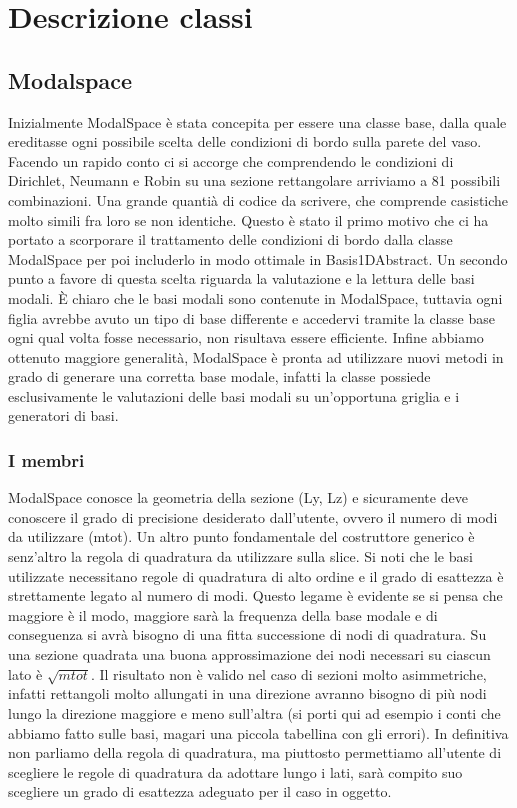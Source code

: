 \chapter{Descrizione classi}
\section{Modalspace}

Inizialmente ModalSpace \`e stata concepita per essere una classe base, dalla quale ereditasse ogni possibile scelta delle condizioni di bordo sulla parete del vaso. Facendo un rapido conto ci si accorge che comprendendo le condizioni di Dirichlet, Neumann e Robin su una sezione rettangolare arriviamo a 81 possibili combinazioni. Una grande quanti\`a di codice da scrivere, che comprende casistiche molto simili fra loro se non identiche. Questo \`e stato il primo motivo che ci ha portato a scorporare il trattamento delle condizioni di bordo dalla classe ModalSpace per poi includerlo in modo ottimale in Basis1DAbstract. Un secondo punto a favore di questa scelta riguarda la valutazione e la lettura delle basi modali. \`E chiaro che le basi modali sono contenute in ModalSpace, tuttavia ogni figlia avrebbe avuto un tipo di base differente e accedervi tramite la classe base ogni qual volta fosse necessario, non risultava essere efficiente. Infine abbiamo ottenuto maggiore generalit\`a, ModalSpace \`e pronta ad utilizzare nuovi metodi in grado di generare una corretta base modale, infatti la classe possiede esclusivamente le valutazioni delle basi modali su un'opportuna griglia e i generatori di basi.

\subsection{I membri}
ModalSpace conosce la geometria della sezione (Ly, Lz) e sicuramente deve conoscere il grado di precisione desiderato dall'utente, ovvero il numero di modi da utilizzare (mtot). 
Un altro punto fondamentale del costruttore generico \`e senz'altro la regola di quadratura da utilizzare sulla slice. Si noti che le basi utilizzate necessitano regole di quadratura di alto ordine e il grado di esattezza \`e strettamente legato al numero di modi. Questo legame \`e evidente se si pensa che maggiore \`e il modo, maggiore sar\`a la frequenza della base modale e di conseguenza si avr\`a bisogno di una fitta successione di nodi di quadratura. Su una sezione quadrata una buona approssimazione dei nodi necessari su ciascun lato \`e $\sqrt{mtot}$. Il risultato non \`e valido nel caso di sezioni molto asimmetriche, infatti rettangoli molto allungati in una direzione avranno bisogno di pi\`u nodi lungo la direzione maggiore e meno sull'altra (si porti qui ad esempio i conti che abbiamo fatto sulle basi, magari una piccola tabellina con gli errori). In definitiva non parliamo della regola di quadratura, ma piuttosto permettiamo all'utente di scegliere le regole di quadratura da adottare lungo i lati, sar\`a compito suo scegliere un grado di esattezza adeguato per il caso in oggetto.

